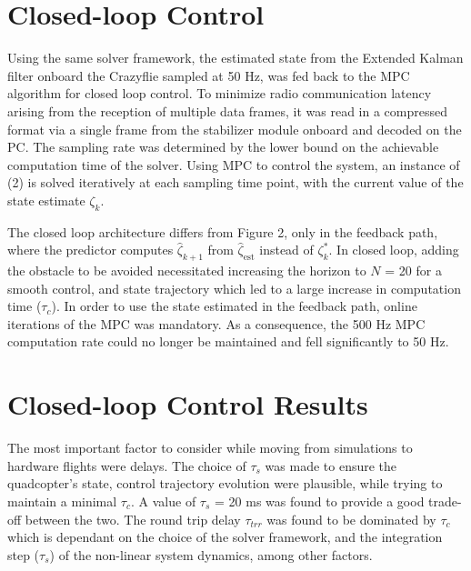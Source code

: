 \documentclass[conference]{IEEEtran}
\begin{document}
\section{Closed-loop Control }\label{Section5}
Using the same solver framework, the estimated state from the Extended Kalman filter onboard the Crazyflie sampled at 50 Hz, was fed back to the MPC algorithm for closed loop control. To minimize radio communication latency arising from the reception of multiple data frames, it was read in a compressed format via a single frame from the stabilizer module onboard and decoded on the PC. The sampling rate was determined by the lower bound on the achievable computation time of the solver. Using MPC to control the system, an instance of (2) is solved iteratively at each sampling time point, with the current value of the state estimate $\zeta_k$. 

The closed loop architecture differs from Figure 2, only in the feedback path, where the predictor computes $\hat{\zeta}_{k+1}$ from $\hat{\zeta}_{\mathrm{est}}$ instead of $\zeta^*_{k}$.
In closed loop, adding the obstacle to be avoided necessitated increasing the horizon to $N$ = 20 for a smooth control, and state trajectory which led to a large increase in computation time ($\tau_c$). In order to use the state estimated in the feedback path, online iterations of the MPC was mandatory. As a consequence, the 500 Hz MPC computation rate could no longer be maintained and fell significantly to 50 Hz.

\section{Closed-loop Control Results}\label{Section6}

The most important factor to consider while moving from simulations to hardware flights were delays. The choice of 
$\tau_s$ was made to ensure the quadcopter's state, control trajectory evolution were plausible, while trying to maintain a minimal $\tau_c$. A value of $\tau_s$ = 20 ms was found to provide a good trade-off between the two. 
The round trip delay $\tau_{trr}$ was found to be dominated by $\tau_{c}$ which is dependant on the choice of the solver framework, and the integration step ($\tau_s$) of the non-linear system dynamics, among other factors.
\end{document}
